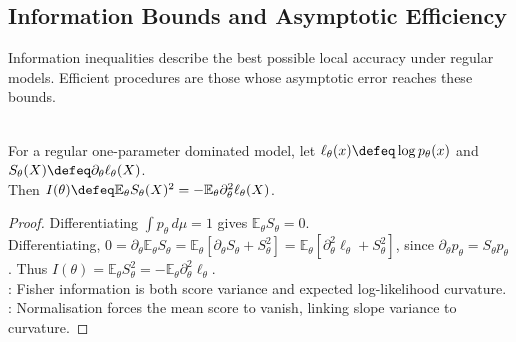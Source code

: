 \subsection{Information Bounds and Asymptotic Efficiency}

Information inequalities describe the best possible local accuracy under regular models.  Efficient procedures are those whose asymptotic error reaches these bounds.

\begin{lemma} \label{lem:fisher-information-second-derivative} \\
For a regular one-parameter dominated model, let $\ell_\theta(x)\defeq\log p_\theta(x)$ and $S_\theta(X)\defeq\partial_\theta\ell_\theta(X)$.\\
Then $I(\theta)\defeq\mathbb{E}_\theta S_\theta(X)^2=-\mathbb{E}_\theta\partial_\theta^2\ell_\theta(X)$.
\begin{proof}
Differentiating $\int p_\theta\,d\mu=1$ gives $\mathbb{E}_\theta S_\theta=0$.\\
Differentiating, $0=\partial_\theta\mathbb{E}_\theta S_\theta=\mathbb{E}_\theta[\partial_\theta S_\theta+S_\theta^2]=\mathbb{E}_\theta[\partial_\theta^2\ell_\theta+S_\theta^2]$, since $\partial_\theta p_\theta=S_\theta p_\theta$. Thus $I(\theta)=\mathbb{E}_\theta S_\theta^2=-\mathbb{E}_\theta\partial_\theta^2\ell_\theta$.\\
: Fisher information is both score variance and expected log-likelihood curvature.\\
: Normalisation forces the mean score to vanish, linking slope variance to curvature.
\end{proof}
\end{lemma}

